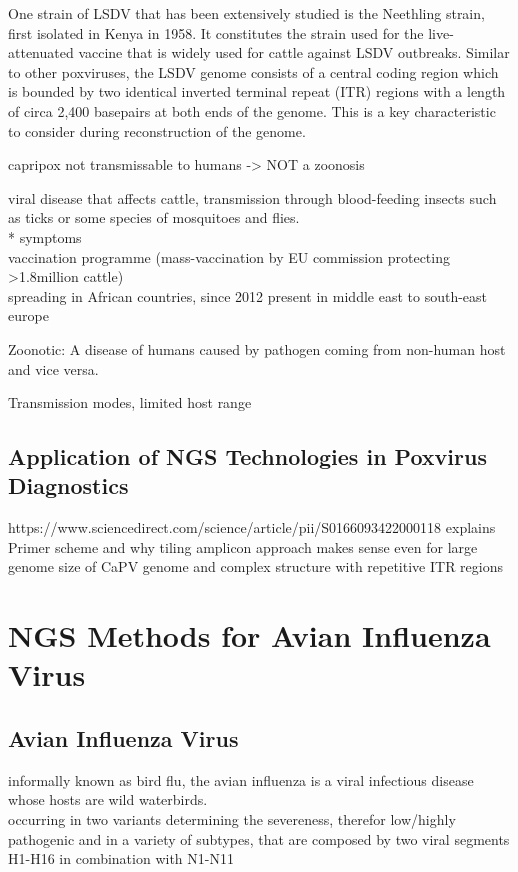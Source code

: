 One strain of LSDV that has been extensively studied is the Neethling strain, first isolated in Kenya in 1958. It constitutes the strain used for the live-attenuated vaccine that is widely used for cattle against LSDV outbreaks. Similar to other poxviruses, the LSDV genome consists of a central coding region which is bounded by two identical inverted terminal repeat (ITR) regions with a length of circa 2,400 basepairs at both ends of the genome. This is a key characteristic to consider during reconstruction of the genome. 

capripox not transmissable to humans -> NOT a zoonosis

viral disease that affects cattle, transmission through blood-feeding insects such as ticks or some species of mosquitoes and flies. \\
* symptoms \\
vaccination programme (mass-vaccination by EU commission protecting >1.8million cattle)\\
spreading in African countries, since 2012 present in middle east to south-east europe

Zoonotic: A disease of humans caused by pathogen coming from non-human host and vice versa.

Transmission modes, limited host range 


\subsection{Application of NGS Technologies in Poxvirus Diagnostics}

https://www.sciencedirect.com/science/article/pii/S0166093422000118 explains Primer scheme and why tiling amplicon approach makes sense even for large genome size of CaPV genome and complex structure with repetitive ITR regions


\section{NGS Methods for Avian Influenza Virus}\label{sec:AIV}
\subsection{Avian Influenza Virus}

informally known as bird flu, the avian influenza is a viral infectious disease whose hosts are wild waterbirds. \\
occurring in two variants determining the severeness, therefor low/highly pathogenic and in a variety of subtypes, that are composed by two viral segments H1-H16 in combination with N1-N11 \\

